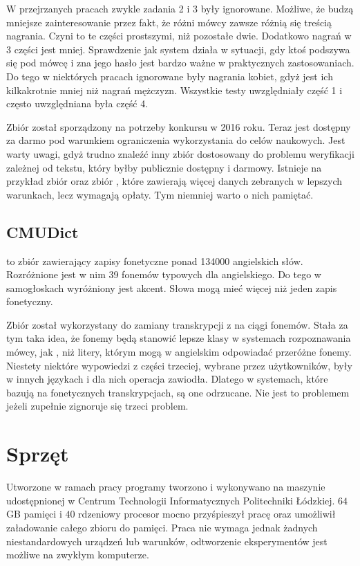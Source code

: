 W przejrzanych pracach zwykle zadania 2 i 3 były ignorowane. Możliwe, że budzą mniejsze zainteresowanie przez fakt,
że różni mówcy zawsze różnią się treścią nagrania. Czyni to te części prostszymi, niż pozostałe dwie.
Dodatkowo nagrań w 3 części jest mniej.
Sprawdzenie jak system działa w sytuacji, gdy ktoś podszywa się pod mówcę i zna jego hasło jest bardzo
ważne w praktycznych zastosowaniach.  Do tego w niektórych pracach ignorowane
były nagrania kobiet, gdyż jest ich kilkakrotnie mniej niż nagrań mężczyzn.
Wszystkie testy uwzględniały część 1 i często uwzględniana była część 4.

Zbiór został sporządzony na potrzeby konkursu w 2016 roku. Teraz jest dostępny za darmo pod warunkiem
ograniczenia wykorzystania do celów naukowych. Jest warty uwagi, gdyż trudno znaleźć inny
zbiór dostosowany do problemu weryfikacji zależnej od tekstu, który byłby publicznie dostępny i darmowy.
Istnieje na przykład zbiór  oraz zbiór , które
zawierają więcej danych zebranych w lepszych warunkach, lecz wymagają opłaty. Tym niemniej warto
o nich pamiętać.

\subsection{CMUDict}

\cite{TheCMUPronouncing} to zbiór zawierający zapisy fonetyczne ponad 134000 angielskich słów.
Rozróżnione jest w nim 39 fonemów typowych dla angielskiego. Do tego w samogłoskach wyróżniony jest akcent.
Słowa mogą mieć więcej niż jeden zapis fonetyczny.

Zbiór został wykorzystany do zamiany transkrypcji z  na ciągi fonemów. Stała
za tym taka idea, że fonemy będą stanowić lepsze klasy w systemach rozpoznawania mówcy, jak
, niż litery, którym mogą w angielskim odpowiadać przeróżne fonemy.
Niestety niektóre wypowiedzi z części trzeciej, wybrane przez użytkowników, były w innych językach
i dla nich operacja zawiodła. Dlatego w systemach, które bazują na fonetycznych transkrypcjach,
są one odrzucane. Nie jest to problemem jeżeli zupełnie zignoruje się trzeci problem.

\section{Sprzęt}\label{sec:sprzet}

Utworzone w ramach pracy programy tworzono i wykonywano na maszynie udostępnionej
w Centrum Technologii Informatycznych Politechniki Łódzkiej. $64$GB pamięci i $40$ rdzeniowy
procesor mocno przyśpieszył pracę oraz umożliwił załadowanie całego zbioru do pamięci.
Praca nie wymaga jednak żadnych niestandardowych urządzeń lub warunków, odtworzenie eksperymentów
jest możliwe na zwykłym komputerze.

